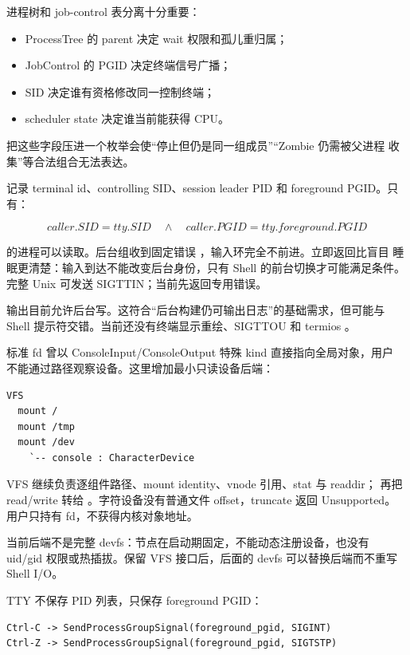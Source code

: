 进程树和 job-control 表分离十分重要：

\begin{itemize}
  \item ProcessTree 的 parent 决定 wait 权限和孤儿重归属；
  \item JobControl 的 PGID 决定终端信号广播；
  \item SID 决定谁有资格修改同一控制终端；
  \item scheduler state 决定谁当前能获得 CPU。
\end{itemize}

把这些字段压进一个枚举会使“停止但仍是同一组成员”“Zombie 仍需被父进程
收集”等合法组合无法表达。

 记录 terminal id、controlling SID、session leader PID 和
foreground PGID。只有：

\[
caller.SID=tty.SID\quad\land\quad caller.PGID=tty.foreground.PGID
\]

的进程可以读取。后台组收到固定错误
，输入环完全不前进。立即返回比盲目
睡眠更清楚：输入到达不能改变后台身份，只有 Shell 的前台切换才可能满足条件。
完整 Unix 可发送 SIGTTIN；当前先返回专用错误。

输出目前允许后台写。这符合“后台构建仍可输出日志”的基础需求，但可能与 Shell
提示符交错。当前还没有终端显示重绘、SIGTTOU 和 termios 。

标准 fd 曾以 ConsoleInput/ConsoleOutput 特殊 kind 直接指向全局对象，用户
不能通过路径观察设备。这里增加最小只读设备后端：

\begin{lstlisting}
VFS
  mount /
  mount /tmp
  mount /dev
    `-- console : CharacterDevice
\end{lstlisting}

VFS 继续负责逐组件路径、mount identity、vnode 引用、stat 与 readdir；
 再把 read/write 转给
。字符设备没有普通文件 offset，truncate 返回 Unsupported。
用户只持有 fd，不获得内核对象地址。

当前后端不是完整 devfs：节点在启动期固定，不能动态注册设备，也没有 uid/gid
权限或热插拔。保留 VFS 接口后，后面的 devfs 可以替换后端而不重写 Shell I/O。

TTY 不保存 PID 列表，只保存 foreground PGID：

\begin{lstlisting}
Ctrl-C -> SendProcessGroupSignal(foreground_pgid, SIGINT)
Ctrl-Z -> SendProcessGroupSignal(foreground_pgid, SIGTSTP)
\end{lstlisting}

